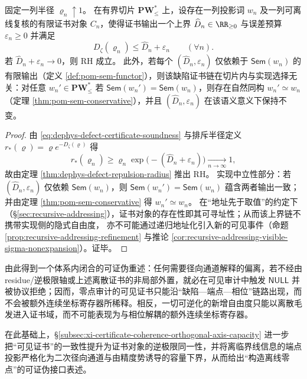 \begin{theorem}\label{thm:dephys-impl-independent-defect-certificate}
固定一列半径 \(\varrho_n\uparrow 1\)。
在有界切片 \(\mathbf{PW}^{\ast}_{\le}\) 上，设存在一列投影词 \(w_n\) 及一列可离线复核的有限证书对象 \(C_n\)，使得证书输出一个上界 \(\widehat D_n\in\RR_{\ge 0}\) 与误差预算 \(\varepsilon_n\ge 0\) 并满足
\begin{equation}\label{eq:dephys-defect-certificate-soundness}
D_{\zeta}(\varrho_n)\le \widehat D_n+\varepsilon_n\qquad(\forall n).
\end{equation}
若 \(\widehat D_n+\varepsilon_n\to 0\)，则 RH 成立。
此外，若每个 \((\widehat D_n,\varepsilon_n)\) 仅依赖于 \(\mathsf{Sem}(w_n)\) 的有限输出（定义 \ref{def:pom-sem-functor}），则该缺陷证书链在切片内与实现选择无关：对任意 \(w_n'\in\mathbf{PW}^{\ast}_{\le}\) 若 \(\mathsf{Sem}(w_n')=\mathsf{Sem}(w_n)\)，则存在自然同构 \(w_n'\simeq w_n\)（定理 \ref{thm:pom-sem-conservative}），并且 \((\widehat D_n,\varepsilon_n)\) 在该语义意义下保持不变。
\end{theorem}

\begin{proof}
由 \eqref{eq:dephys-defect-certificate-soundness} 与排斥半径定义 \(r_{\ast}(\varrho)=\varrho e^{-D_{\zeta}(\varrho)}\) 得
\[
r_{\ast}(\varrho_n)\ge \varrho_n\exp\!\bigl(-(\widehat D_n+\varepsilon_n)\bigr)\xrightarrow[n\to\infty]{}1,
\]
故由定理 \ref{thm:dephys-defect-repulsion-radius} 推出 RH。
实现中立性部分：若 \((\widehat D_n,\varepsilon_n)\) 仅依赖 \(\mathsf{Sem}(w_n)\)，则 \(\mathsf{Sem}(w_n')=\mathsf{Sem}(w_n)\) 蕴含两者输出一致；并由定理 \ref{thm:pom-sem-conservative} 得 \(w_n'\simeq w_n\)。
在“地址先于取值”的约定下（\S\ref{sec:recursive-addressing}），证书对象的存在性即其可寻址性；从而该上界链不携带实现侧的隐式自由度，
亦不可能通过递归地址化引入新的可见事件（命题 \ref{prop:recursive-addressing-refinement} 与推论 \ref{cor:recursive-addressing-visible-sigma-nonexpansion}）。证毕。
\end{proof}

由此得到一个体系内闭合的可证伪重述：任何需要径向通道解释的偏离，若不经由 residue/逆极限轴或上述离散证书的非局部外置，就必在可见审计中触发 \(\mathsf{NULL}\) 并被协议拒绝；因而，零点审计的可见证书只能沿“缺陷—端点—相位”链路出现，而不会被额外连续坐标寄存器所稀释。相反，一切可逆化的新增自由度只能以离散毛发进入证书域，而不可能表现为与相位解耦的额外连续坐标寄存器。

在此基础上，\S\ref{subsec:xi-certificate-coherence-orthogonal-axis-capacity} 进一步把“可见证书”的一致性提升为证书对象的逆极限同一性，并将离临界线信息的端点投影严格化为二次径向通道与由精度势诱导的容量下界，从而给出“构造离线零点”的可证伪接口表述。
\endinput
